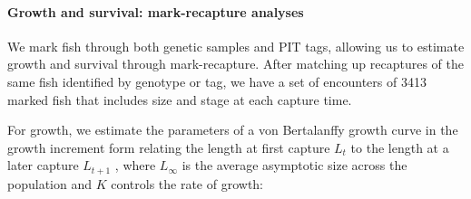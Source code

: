 \documentclass[12pt, oneside]{article}   	%
\begin{document}


\paragraph*{Growth and survival: mark-recapture analyses}

We mark fish through both genetic samples and PIT tags, allowing us to estimate growth and survival through mark-recapture. After matching up recaptures of the same fish identified by genotype or tag, we have a set of encounters of 3413 marked fish that includes size and stage at each capture time.

For growth, we estimate the parameters of a von Bertalanffy growth curve \citep{fabens1965properties} in the growth increment form relating the length at first capture $L_t$ to the length at a later capture $L_{t+1}$ \citep{hart2009estimating}, where $L_\infty$ is the average asymptotic size across the population and $K$ controls the rate of growth: %
\end{document}
